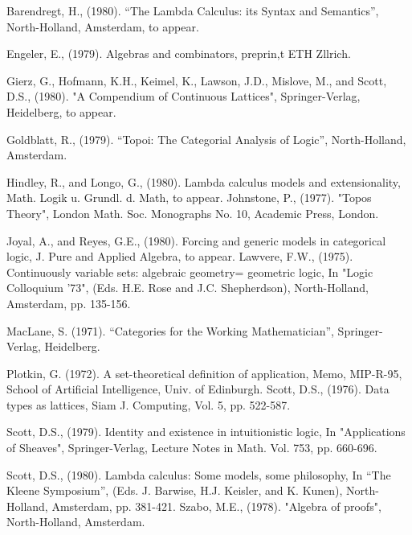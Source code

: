 \begin{thebibliography}{86}

 Barendregt, H., (1980). ``The Lambda Calculus: its Syntax and Semantics'', North-Holland, Amsterdam, to appear.

 Engeler, E., (1979).  Algebras and combinators, preprin,t ETH Zllrich.

 Gierz, G., Hofmann, K.H., Keimel, K., Lawson, J.D., Mislove, M., and Scott, D.S., (1980). "A Compendium of Continuous Lattices", Springer-Verlag, Heidelberg, to appear.

 Goldblatt, R., (1979). ``Topoi: The Categorial Analysis of Logic'', North-Holland, Amsterdam.

 Hindley, R., and Longo, G., (1980). Lambda calculus models and extensionality, Math. Logik u. Grundl. d. Math, to appear.
Johnstone, P., (1977). "Topos Theory", London Math. Soc.
Monographs No. 10, Academic Press, London.

 Joyal, A., and Reyes, G.E., (1980). Forcing and generic models in categorical logic, J. Pure and Applied Algebra, to appear.
Lawvere, F.W., (1975). Continuously variable sets: algebraic geometry= geometric logic, In "Logic Colloquium '73", (Eds. H.E. Rose and J.C. Shepherdson), North-Holland, Amsterdam, pp. 135-156.

 MacLane, S. (1971). ``Categories for the Working Mathematician'', Springer-Verlag, Heidelberg.

 Plotkin, G. (1972). A set-theoretical definition of application, Memo, MIP-R-95, School of Artificial Intelligence, Univ. of Edinburgh.
Scott, D.S., (1976). Data types as lattices, Siam J. Computing,
Vol. 5, pp. 522-587.

 Scott, D.S., (1979). Identity and existence in intuitionistic logic, In "Applications of Sheaves", Springer-Verlag, Lecture Notes in Math. Vol. 753, pp. 660-696.

 Scott, D.S., (1980). Lambda calculus: Some models, some philosophy, In ``The Kleene Symposium'', (Eds. J. Barwise,
H.J. Keisler, and K. Kunen), North-Holland, Amsterdam, pp. 381-421.
Szabo, M.E., (1978). "Algebra of proofs", North-Holland, Amsterdam.

\end{thebibliography}